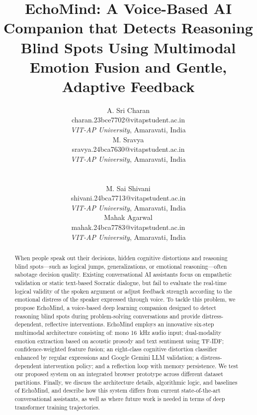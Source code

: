 \documentclass[conference]{IEEEtran}
\begin{document}
\title{EchoMind: A Voice-Based AI Companion that Detects Reasoning Blind Spots Using Multimodal Emotion Fusion and Gentle, Adaptive Feedback}

\newcommand{\authorbox}[2]{%
  \begin{minipage}[t]{0.46\textwidth}
    \centering
    {\fontsize{11}{13}\selectfont #1}\\
    #2\\
    \textit{VIT-AP University}, Amaravati, India
  \end{minipage}}

\author{%
\parbox{\textwidth}{\centering
\authorbox{A. Sri Charan}{charan.23bce7702@vitapstudent.ac.in}%
\hfill
\authorbox{M. Sravya}{sravya.24bca7630@vitapstudent.ac.in}%
\\[1.5ex]
\authorbox{M. Sai Shivani}{shivani.24bca7713@vitapstudent.ac.in}%
\hfill
\authorbox{Mahak Agarwal}{mahak.24bca7783@vitapstudent.ac.in}%
}}

\maketitle

\begin{abstract}
When people speak out their decisions, hidden cognitive distortions and reasoning blind spots---such as logical jumps, generalizations, or emotional reasoning---often sabotage decision quality. Existing conversational AI assistants focus on empathetic validation or static text-based Socratic dialogue, but fail to evaluate the real-time logical validity of the spoken argument or adjust feedback strength according to the emotional distress of the speaker expressed through voice. To tackle this problem, we propose EchoMind, a voice-based deep learning companion designed to detect reasoning blind spots during problem-solving conversations and provide distress-dependent, reflective interventions. EchoMind employs an innovative six-step multimodal architecture consisting of: mono 16~kHz audio input; dual-modality emotion extraction based on acoustic prosody and text sentiment using TF-IDF; confidence-weighted feature fusion; an eight-class cognitive distortion classifier enhanced by regular expressions and Google Gemini LLM validation; a distress-dependent intervention policy; and a reflection loop with memory persistence. We test our proposed system on an integrated browser prototype across different dataset partitions. Finally, we discuss the architecture details, algorithmic logic, and baselines of EchoMind, and describe how this system differs from current state-of-the-art conversational assistants, as well as where future work is needed in terms of deep transformer training trajectories.
\end{abstract}
\end{document}
